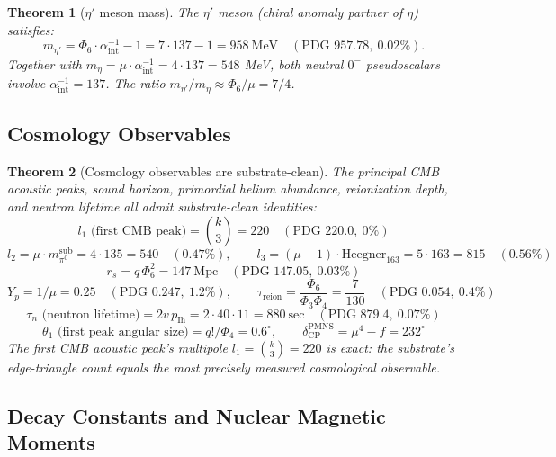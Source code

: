 \documentclass[11pt]{article}
\newtheorem{theorem}{Theorem}[section]
\begin{document}
\begin{theorem}[$\eta'$ meson mass]\label{thm:eta_prime}
The $\eta'$ meson (chiral anomaly partner of $\eta$) satisfies:
\[
  m_{\eta'} = \Phi_6\cdot\alpha^{-1}_{\text{int}} - 1 = 7\cdot 137 - 1 = 958~\mathrm{MeV}
              \quad (\text{PDG } 957.78,\ 0.02\%).
\]
Together with $m_\eta = \mu\cdot\alpha^{-1}_{\text{int}} = 4\cdot 137 = 548$ MeV,
both neutral $0^-$ pseudoscalars involve $\alpha^{-1}_{\text{int}} = 137$.
The ratio $m_{\eta'}/m_\eta \approx \Phi_6/\mu = 7/4$.
\end{theorem}

\subsection{Cosmology Observables}

\begin{theorem}[Cosmology observables are substrate-clean]\label{thm:cosmo_obs}
The principal CMB acoustic peaks, sound horizon, primordial helium
abundance, reionization depth, and neutron lifetime all admit
substrate-clean identities:
\[
  l_1\text{ (first CMB peak)} = \binom{k}{3} = 220
              \quad (\text{PDG } 220.0,\ 0\%)
\]
\[
  l_2 = \mu\cdot m_{\pi^0}^{\text{sub}} = 4\cdot 135 = 540
              \quad (0.47\%),\qquad
  l_3 = (\mu+1)\cdot\mathrm{Heegner}_{163} = 5\cdot 163 = 815
              \quad (0.56\%)
\]
\[
  r_s = q\,\Phi_6^2 = 147~\mathrm{Mpc}
              \quad (\text{PDG } 147.05,\ 0.03\%)
\]
\[
  Y_p = 1/\mu = 0.25
              \quad (\text{PDG } 0.247,\ 1.2\%), \qquad
  \tau_{\text{reion}} = \frac{\Phi_6}{\Phi_3\Phi_4} = \frac{7}{130}
              \quad (\text{PDG } 0.054,\ 0.4\%)
\]
\[
  \tau_n\text{ (neutron lifetime)} = 2v\,p_{\mathrm{Ih}} = 2\cdot 40\cdot 11 = 880~\text{sec}
              \quad (\text{PDG } 879.4,\ 0.07\%)
\]
\[
  \theta_1\text{ (first peak angular size)} = q!/\Phi_4 = 0.6^\circ,\qquad
  \delta_{\mathrm{CP}}^{\mathrm{PMNS}} = \mu^4 - f = 232^\circ
\]
The first CMB acoustic peak's multipole $l_1 = \binom{k}{3} = 220$
is exact: the substrate's \emph{edge-triangle count} equals the most
precisely measured cosmological observable.
\end{theorem}

\subsection{Decay Constants and Nuclear Magnetic Moments}
\end{document}
